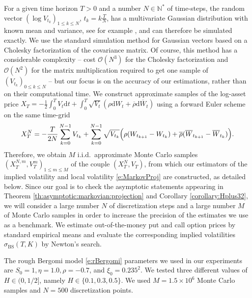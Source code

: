 \documentclass[11pt]{article}
\theoremstyle{plain}
\theoremstyle{definition}
\theoremstyle{remark}
\renewcommand{\bar}{\overline}
\newcommand{\dd}{\mathrm{d}}
\newcommand{\cO}{\mathcal{O}}
\newcommand{\1}{\mathbf{1}}
\numberwithin{equation}{section}
\def\sigBS{\sigma_\mathrm{BS}}
\begin{document}
For a given time horizon $T>0$ and a number $N \in \mathbb{N}^{*}$ of time-steps, the random vector $(\log V_{t_k})_{1 \le k \le N}$, $t_k = k \frac T N$, has a multivariate Gaussian distribution with known mean and variance, see for example \cite{bayer2016pricing}, and can therefore be simulated exactly. We use the standard simulation method for Gaussian vectors based on a Cholesky factorization of the covariance matrix. Of course, this method has a considerable complexity  -- cost $\cO(N^3)$ for the Cholesky factorization  and $\cO(N^2)$ for the matrix multiplication required to get one sample of  $(V_{t_k})_{0 \leq k \leq N}$ --  but our focus is on the accuracy of our estimations, rather than on their computational time.
We construct approximate samples of  the log-asset price
$X_{T} = -\frac{1}{2}\int_{0}^{T}V_{t}\dd t + \int_{0}^{T}\sqrt{V_{t}}(\rho \dd W_{t} + \bar \rho \dd \bar{W}_{t})$
using a forward Euler scheme on the same time-grid
\[
X^N_{T} = - \frac{T}{2 N} \sum_{k=0}^{N-1} V_{t_k} 
+ \sum_{k=0}^{N-1} \sqrt{V_{t_k}} \Bigl(\rho (W_{t_{k+1}} - W_{t_k}) + \bar \rho (\overline W_{t_{k+1}} - \overline W_{t_k}) \Bigr).
\]
Therefore, we obtain $M$ i.i.d.\ approximate Monte Carlo samples $(X^{N,m}_{T}, V^m_T)_{1 \le m \le M}$ of the couple $(X_T^N, V_T)$, from which
our estimators of the implied volatility  and local volatility \eqref{e:MarkovProj} are constructed, as detailed below.
Since our goal is to check the asymptotic statements appearing in Theorem \ref{th:asymptotic:markovian:projection} and 
Corollary \ref{corollary:Hplus32},  we will consider a large number $N$ of discretization steps and a large number $M$
of Monte Carlo samples in order to increase the precision of the estimates we use as a benchmark.
We estimate out-of-the-money put and call option prices by standard empirical means and evaluate the corresponding implied volatilities
$\sigBS(T,K)$ by Newton's search.

The rough Bergomi model \eqref{e:rBergomi} parameters we used in our experiments are $S_0 = 1, \eta = 1.0, \rho = -0.7$, and $\xi_0 = 0.235^2$.
We tested three different values of $H \in (0,1/2]$, namely $H \in \{0.1, 0.3, 0.5\}$. We used $M = 1.5 \times 10^6$ Monte Carlo samples and $N = 500$ discretization points.
\end{document}
